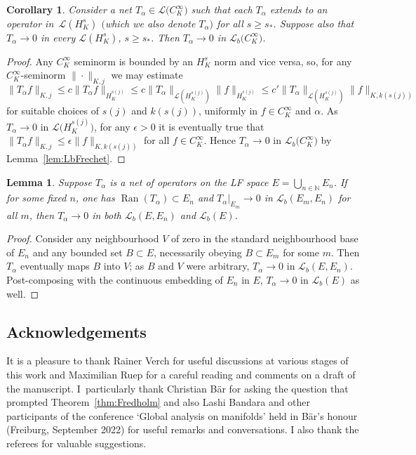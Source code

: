 \documentclass[pdftex]{sigma}
\numberwithin{equation}{section}
\newtheorem{Corollary}[Theorem]{Corollary}
\newtheorem{Lemma}[Theorem]{Lemma}
\newcommand{\NN}{{\mathbb N}}
\newcommand{\LL}{{\mathcal L}}
\newcommand{\Ran}{\operatorname{Ran}}
\begin{document}
 \begin{Corollary} \label{cor:HstoCinfty}
 	Consider a net $T_\alpha\in \LL\big(C^\infty_K\big)$
 	such that each $T_\alpha$ extends to an operator in~$\LL(H^s_K)$ $($which we also denote $T_\alpha$$)$ for all $s\ge s_*$. Suppose also that $T_\alpha\to 0$ in every $\LL(H^s_K)$, $s\ge s_*$. Then $T_\alpha\to 0$ in $\LL_b\big(C^\infty_K\big)$.
 \end{Corollary}
 \begin{proof}
Any $C^\infty_K$ seminorm is bounded by an $H^s_K$ norm and vice versa, so, for any
 	$C^\infty_K$-seminorm $\|\cdot\|_{K,j}$ we may estimate
 	\begin{equation*}
 		\|T_\alpha f\|_{K,j} \le c \| T_\alpha f\|_{H^{s(j)}_K} \le c\|T_\alpha\|_{\LL(H^{s(j)}_K)} \|f\|_{H^{s(j)}_K}
 		\le c' \|T_\alpha\|_{\LL(H^{s(j)}_K)} \|f\|_{K,k(s(j))}
 	\end{equation*}
 	for suitable choices of $s(j)$ and $k(s(j))$, uniformly in $f\in C^\infty_K$ and $\alpha$.
 	As $T_\alpha\to 0$ in $\LL\big(H^{s(j)}_K\big)$, for any $\epsilon>0$ it is eventually true that
 	$\|T_\alpha f\|_{K,j} \le \epsilon \|f\|_{K,k(s(j))}$ for all $f\in C^\infty_K$. Hence $T_\alpha\to 0$ in $\LL_b\big(C^\infty_K\big)$ by Lemma~\ref{lem:LbFrechet}.
 \end{proof}

 \begin{Lemma}\label{lem:LbLF}
 	Suppose $T_\alpha$ is a net of operators on the LF space $E=\bigcup_{n\in\NN} E_n$. If for some fixed $n$, one has $\Ran(T_\alpha)\subset E_n$ and $T_\alpha|_{E_m}\to 0$ in $\LL_b(E_m,E_n)$ for all $m$, then $T_\alpha\to 0$ in both $\LL_b(E,E_n)$ and $\LL_b(E)$.
 \end{Lemma}
 \begin{proof}
 	Consider any neighbourhood $V$ of zero in the standard neighbourhood base of $E_n$ and any bounded set $B\subset E$, necessarily obeying $B\subset E_m$ for some $m$. Then $T_\alpha$ eventually maps $B$ into $V$; as $B$ and $V$ were arbitrary, $T_\alpha\to 0$ in $\LL_b(E,E_n)$. Post-composing with the continuous embedding of $E_n$ in $E$, $T_\alpha\to 0$ in $\LL_b(E)$ as well.
 \end{proof}

\subsection*{Acknowledgements}
 	It is a pleasure to thank Rainer Verch for useful discussions at various stages of this work and Maximilian Ruep for a careful reading and comments on a draft of the manuscript. I~particularly thank Christian B\"ar for asking the question that prompted Theorem~\ref{thm:Fredholm} and also Lashi Bandara and other participants of the conference `Global analysis on manifolds' held in B\"ar's honour (Freiburg, September 2022) for useful remarks and conversations. I also thank the referees for valuable suggestions.
\end{document}
